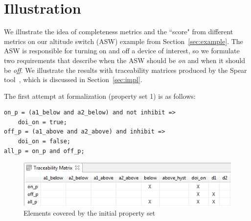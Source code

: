 \section{Illustration}
\label{sec:illust}

\newcommand{\allp}{\texttt{all\_p}}
\newcommand{\onp}{\texttt{on\_p}}
\newcommand{\offp}{\texttt{off\_p}}
\newcommand{\hystp}{\texttt{hyst\_p}}
\newcommand{\aonebelow}{\texttt{a1\_below}}
\newcommand{\atwobelow}{\texttt{a2\_below}}
\newcommand{\aoneabove}{\texttt{a1\_above}}
\newcommand{\atwoabove}{\texttt{a2\_above}}
\newcommand{\doion}{\texttt{doi\_on}}
\newcommand{\done}{\texttt{d1}}
\newcommand{\dtwo}{\texttt{d2}}
\newcommand{\abovehyst}{\texttt{above\_hyst}}
\newcommand{\inhibit}{\texttt{inhibit}}

We illustrate the idea of completeness metrics and the ``score" from different metrics on our altitude switch (ASW) example from Section~\ref{sec:example}.  %
%
The ASW is responsible for turning on and off a device of interest, so we formulate two requirements that describe when the ASW should be {\em on} and when it should be {\em off}.  We illustrate the results with traceability matrices produced by the Spear tool~\cite{Spear}, which is discussed in Section~\ref{sec:impl}.

The first attempt at formalization (property set 1) is as follows:

{\smaller
\begin{verbatim}
on_p = (a1_below and a2_below) and not inhibit =>
    doi_on = true;
off_p = (a1_above and a2_above) and inhibit =>
    doi_on = false;
all_p = on_p and off_p;
\end{verbatim}
}

\begin{figure}
  \centering
  \includegraphics[width=\columnwidth]{figs/spear_set1.png}
  \vspace{-0.2in}
  \caption{Elements covered by the initial property set}
  \label{fig:propertyset1}
\end{figure}


